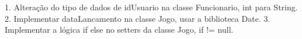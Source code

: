1. Alteração do tipo de dados de idUsuario na classe Funcionario, int para String.
2. Implementar dataLancamento na classe Jogo, usar a biblioteca Date.
3. Implementar a lógica if else no setters da classe Jogo, if != null.